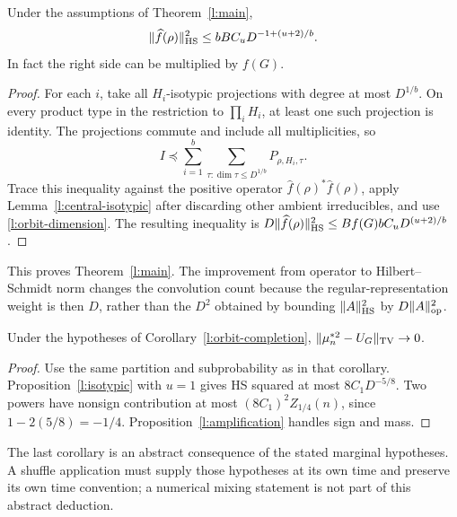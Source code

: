 \begin{proposition}\label{l:isotypic}
Under the assumptions of Theorem~\ref{l:main},
\[
 \|\widehat f(\rho)\|_{\mathrm{HS}}^2\le bBC_uD^{-1+(u+2)/b}.
\]
In fact the right side can be multiplied by $f(G)$.
\end{proposition}
\begin{proof}
For each $i$, take all $H_i$-isotypic projections with degree at most $D^{1/b}$. On every product type in the restriction to $\prod_iH_i$, at least one such projection is identity. The projections commute and include all multiplicities, so
\begin{equation}\label{l:projection-cover}
 I\preceq\sum_{i=1}^b\sum_{\tau:\dim\tau\le D^{1/b}}P_{\rho,H_i,\tau}.
\end{equation}
Trace this inequality against the positive operator $\widehat f(\rho)^*\widehat f(\rho)$, apply Lemma~\ref{l:central-isotypic} after discarding other ambient irreducibles, and use \eqref{l:orbit-dimension}. The resulting inequality is $D\|\widehat f(\rho)\|_{\mathrm{HS}}^2\le Bf(G)bC_uD^{(u+2)/b}$.
\end{proof}

This proves Theorem~\ref{l:main}. The improvement from operator to Hilbert--Schmidt norm changes the convolution count because the regular-representation weight is then $D$, rather than the $D^2$ obtained by bounding $\|A\|_{\mathrm{HS}}^2$ by $D\|A\|_{\mathrm{op}}^2$.

\begin{corollary}\label{l:isotypic-completion}\label{l:four-convolutions}
Under the hypotheses of Corollary~\ref{l:orbit-completion}, $\|\mu_n^{*2}-U_G\|_{\mathrm{TV}}\to0$.
\end{corollary}
\begin{proof}
Use the same partition and subprobability as in that corollary. Proposition~\ref{l:isotypic} with $u=1$ gives HS squared at most $8C_1D^{-5/8}$. Two powers have nonsign contribution at most $(8C_1)^2 Z_{1/4}(n)$, since $1-2(5/8)=-1/4$. Proposition~\ref{l:amplification} handles sign and mass.
\end{proof}

The last corollary is an abstract consequence of the stated marginal hypotheses. A shuffle application must supply those hypotheses at its own time and preserve its own time convention; a numerical mixing statement is not part of this abstract deduction.
